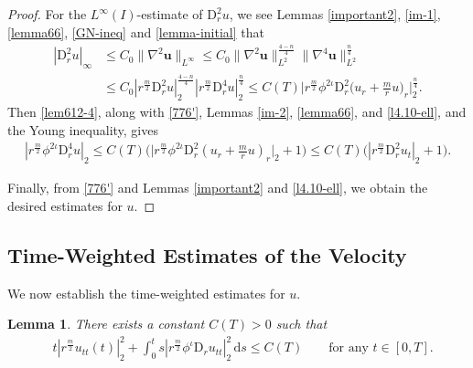 \documentclass[11pt,reqno]{amsart}
\newtheorem{lem}{Lemma}[section]
\numberwithin{rk}{section}
\numberwithin{prop}{section}
\numberwithin{mydef}{section}
\numberwithin{lem}{section}
\numberwithin{equation}{section}
\numberwithin{thm}{section}
\begin{document}
\begin{proof}
For the $L^\infty(I)$-estimate of $\mathrm{D}_r^2 u$, we see Lemmas \ref{important2}, \ref{im-1}, \ref{lemma66}, \ref{GN-ineq} and \ref{lemma-initial} that
\begin{equation}\label{776'}
\begin{aligned}
|\mathrm{D}_r^2 u|_\infty&\leq C_0\|\nabla^2 \boldsymbol{u}\|_{L^\infty}\leq C_0\|\nabla^2 \boldsymbol{u}\|_{L^2}^\frac{4-n}{4}\|\nabla^4 \boldsymbol{u}\|_{L^2}^\frac{n}{4}\\
&\leq C_0 |r^\frac{m}{2}\mathrm{D}_r^2 u|_{2}^\frac{4-n}{4}|r^\frac{m}{2}\mathrm{D}_r^4 u|_{2}^\frac{n}{4}\leq C(T) \Big|r^\frac{m}{2} \phi^{2\iota}\mathrm{D}_r^2\big(u_r+\frac{m}{r}u\big)_{r} \Big|_2^\frac{n}{4}.
\end{aligned}
\end{equation}
Then \eqref{lem612-4}, along with \eqref{776'}, Lemmas \ref{im-2}, \ref{lemma66}, and \ref{l4.10-ell}, and the Young inequality, gives
\begin{equation}\label{4jir}
\begin{aligned}
|r^\frac{m}{2}\phi^{2\iota}\mathrm{D}_r^4 u|_{2}\leq C(T)\big(\big|r^\frac{m}{2} \phi^{2\iota}\mathrm{D}_r^2(u_r+\frac{m}{r}u)_{r} \big|_2+1\big)
\leq C(T)\big(|r^\frac{m}{2}\mathrm{D}_r^2 u_t|_2 +1\big).
\end{aligned}
\end{equation}

Finally, from \eqref{776'} and Lemmas \ref{important2} and \ref{l4.10-ell}, we obtain  the desired estimates for $u$.
\end{proof}

\subsection{Time-Weighted Estimates of the Velocity}
We now establish the time-weighted estimates for $u$.
\begin{lem}\label{Lemma6.13}  
There exists a constant $C(T)>0$ such that
\begin{equation*}
\begin{aligned}
&t|r^{\frac{m}{2}}u_{tt}(t)|^2_2+\int_{0}^{t} s |r^{\frac{m}{2}}\phi^\iota \mathrm{D}_r u_{tt}|^2_2 \,\mathrm{d}s\leq C(T) \qquad \text{for any $t\in [0,T]$}.
\end{aligned}
\end{equation*}
\end{lem}
\end{document}
